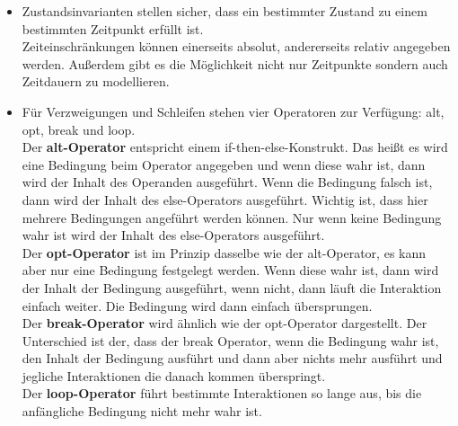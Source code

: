\documentclass[a4paper, 12pt, margins=2.5cm]{homework}
\begin{document}
  \begin{problem}
    
  \end{problem}
  \begin{solution}\hfill
    \begin{itemize}
      \item Zustandsinvarianten stellen sicher, dass ein bestimmter Zustand zu einem
            bestimmten Zeitpunkt erfüllt ist. \\
            Zeiteinschränkungen können einerseits absolut, andererseits relativ angegeben werden.
            Außerdem gibt es die Möglichkeit nicht nur Zeitpunkte sondern auch Zeitdauern
            zu modellieren.

      \item Für Verzweigungen und Schleifen stehen vier Operatoren zur Verfügung:
            alt, opt, break und loop. \\
            Der \textbf{alt-Operator} entspricht einem if-then-else-Konstrukt. Das heißt
            es wird eine Bedingung beim Operator angegeben und wenn diese wahr ist, 
            dann wird der Inhalt des Operanden ausgeführt. Wenn die Bedingung falsch
            ist, dann wird der Inhalt des else-Operators ausgeführt. Wichtig ist,
            dass hier mehrere Bedingungen angeführt werden können. Nur wenn keine 
            Bedingung wahr ist wird der Inhalt des else-Operators ausgeführt. \\
            Der \textbf{opt-Operator} ist im Prinzip dasselbe wie der alt-Operator, es kann
            aber nur eine Bedingung festgelegt werden. Wenn diese wahr ist, dann 
            wird der Inhalt der Bedingung ausgeführt, wenn nicht, dann läuft die
            Interaktion einfach weiter. Die Bedingung wird dann einfach übersprungen. \\
            Der \textbf{break-Operator} wird ähnlich wie der opt-Operator dargestellt.
            Der Unterschied ist der, dass der break Operator, wenn die Bedingung
            wahr ist, den Inhalt der Bedingung ausführt und dann aber nichts mehr
            ausführt und jegliche Interaktionen die danach kommen überspringt. \\
            Der \textbf{loop-Operator} führt bestimmte Interaktionen so lange aus, 
            bis die anfängliche Bedingung nicht mehr wahr ist. 


\end{itemize}
\end{solution}
\end{document}
